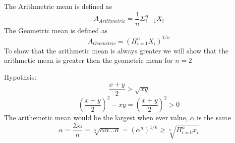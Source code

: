 \documentclass[letterpaper,12pt,titlepage]{article}
\begin{document}
\begin{mdframed}[style=MyFrame]
The Arithmetric mean is defined as 
\begin{equation}
A_{Arithmetric}=\frac{1}{n}\Sigma_{i=1}^nX_i
\end{equation}
The Geometric mean is defined as 
\begin{equation} 
A_{Geometric}=(\Pi_{i=1}^nX_i)^{1/n}
\end{equation}
To show that the arithmetic mean is always greater we will show that the arithmetic mean is greater then the geometric mean for $n=2$


Hypothsis:\begin{equation}
\frac{x+y}{2}>\sqrt{xy}
\end{equation}
\begin{equation}
(\frac{x+y}{2})^2-xy = (\frac{x+y}{2})^2 > 0
\end{equation}
The arithemetic mean would be the largest when ever value, $\alpha$ is the same
\begin{equation}
\alpha=\frac{\Sigma \alpha}{n}=\sqrt[n]{\alpha \alpha...\alpha}=(\alpha^n)^{1/n} \geq \sqrt[n]{\Pi_{i=0}^n x_i}
\end{equation}


\end{mdframed}



\end{document}
